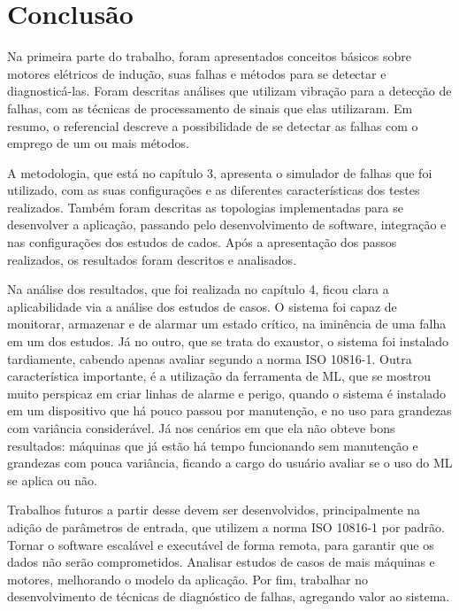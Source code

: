 
\chapter[Conclusão]{Conclusão}

Na primeira parte do trabalho, foram apresentados conceitos básicos sobre motores elétricos de indução, suas falhas e métodos para se 
detectar e diagnosticá-las. Foram descritas análises que utilizam vibração para a detecção de falhas, com as
técnicas de processamento de sinais que elas utilizaram. Em resumo, o referencial descreve a possibilidade de se detectar
as falhas com o emprego de um ou mais métodos.

A metodologia, que está no capítulo 3, apresenta o simulador de falhas que foi utilizado, com as suas configurações e as
diferentes características dos testes realizados. Também foram descritas as topologias implementadas para se desenvolver a aplicação, passando 
pelo desenvolvimento de software, integração e nas configurações dos estudos de cados. 
Após a apresentação dos passos realizados, os resultados foram descritos e analisados.

Na análise dos resultados, que foi realizada no capítulo 4, ficou clara a aplicabilidade via a análise dos estudos de casos. O sistema foi
capaz de monitorar, armazenar e de alarmar um estado crítico, na iminência de uma falha em um dos estudos. Já no outro, que se trata do exaustor,
o sistema foi instalado tardiamente, cabendo apenas avaliar segundo a norma ISO 10816-1. Outra característica importante, é a utilização da
ferramenta de ML, que se mostrou muito perspicaz em criar linhas de alarme e perigo, quando o sistema é instalado em um dispositivo
que há pouco passou por manutenção, e no uso para grandezas com variância considerável. Já nos cenários em que ela não obteve bons resultados:
máquinas que já estão há tempo funcionando sem manutenção e grandezas com pouca variância, ficando a cargo do usuário avaliar se o uso do 
ML se aplica ou não. 

Trabalhos futuros a partir desse devem ser desenvolvidos, principalmente na adição de parâmetros de entrada, que utilizem a norma ISO 10816-1
por padrão. Tornar o software escalável e executável de forma remota, para garantir que os dados não serão comprometidos. Analisar estudos de 
casos de mais máquinas e motores, melhorando o modelo da aplicação. Por fim, trabalhar no desenvolvimento de técnicas de diagnóstico de falhas,
agregando valor ao sistema. 




